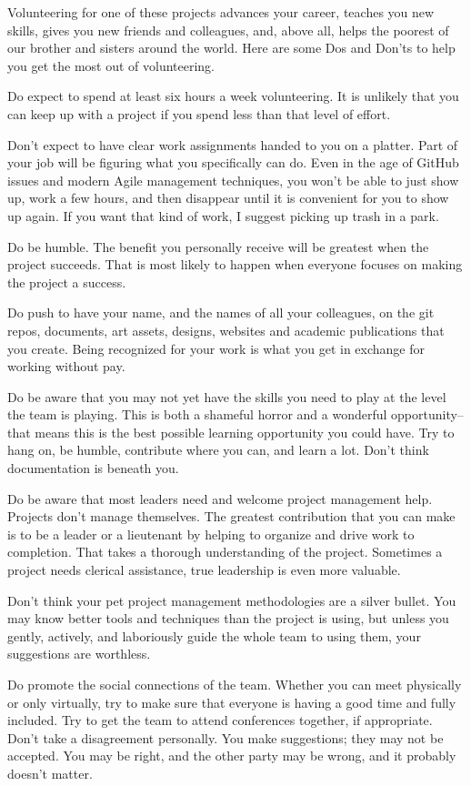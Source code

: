\documentclass[
	fontsize=10pt, %
	twoside=false, %
	secnumdepth=1, %
]{kaobook}
\begin{document}
Volunteering for one of these projects advances your career, teaches you new skills, gives you new friends and colleagues, and, above all, helps the poorest of our brother and sisters around the world. Here are some Dos and Don'ts to help you get the most out of volunteering.

Do expect to spend at least six hours a week volunteering. It is unlikely that you can keep up with a project if you spend less than that level of effort.

Don't expect to have clear work assignments handed to you on a platter. Part of your job will be figuring what you specifically can do. Even in the age of GitHub issues and modern Agile management techniques, you won't be able to just show up, work a few hours, and then disappear until it is convenient for you to show up again. If you want that kind of work, I suggest picking up trash in a park.

Do be humble. The benefit you personally receive will be greatest when the project succeeds. That is most likely to happen when everyone focuses on making the project a success.

Do push to have your name, and the names of all your colleagues, on the git repos, documents, art assets, designs, websites and academic publications that you create. Being recognized for your work is what you get in exchange for working without pay.

Do be aware that you may not yet have the skills you need to play at the level the team is playing. This is both a shameful horror and a wonderful opportunity--that means this is the best possible learning opportunity you could have. Try to hang on, be humble, contribute where you can, and learn a lot.
Don't think documentation is beneath you.

Do be aware that most leaders need and welcome project management help. Projects don't manage themselves. The greatest contribution that you can make is to be a leader or a lieutenant by helping to organize and drive work to completion. That takes a thorough understanding of the project. Sometimes a project needs clerical assistance, true leadership is even more valuable.

Don't think your pet project management methodologies are a silver bullet. You may know better tools and techniques than the project is using, but unless you gently, actively, and laboriously guide the whole team to using them, your suggestions are worthless.

Do promote the social connections of the team. Whether you can meet physically or only virtually, try to make sure that everyone is having a good time and fully included. Try to get the team to attend conferences together, if appropriate.
Don't take a disagreement personally. You make suggestions; they may not be accepted. You may be right, and the other party may be wrong, and it probably doesn't matter.
\end{document}
